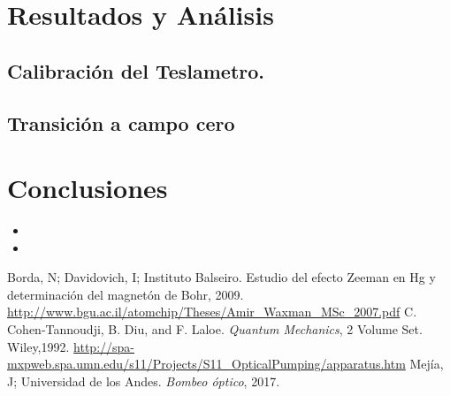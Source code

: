 \documentclass[%
 reprint,
 amsmath,amssymb,
 aps,
]{revtex4-1}
\begin{document}
\section{Resultados y Análisis}
\subsection{Calibración del Teslametro.}
\subsection{Transición a campo cero}


\section{Conclusiones}
\begin{itemize}
    \item 
    \item 
\end{itemize}

\begin{thebibliography}{9}
Borda, N; Davidovich, I; Instituto Balseiro. Estudio del efecto Zeeman en Hg y determinación del magnetón de Bohr, 2009.
\url{http://www.bgu.ac.il/atomchip/Theses/Amir_Waxman_MSc_2007.pdf}
C. Cohen-Tannoudji, B. Diu, and F. Laloe. \textit{Quantum Mechanics}, 2 Volume Set. Wiley,1992.
\url{http://spa-mxpweb.spa.umn.edu/s11/Projects/S11_OpticalPumping/apparatus.htm}
Mejía, J; Universidad de los Andes. \textit{Bombeo óptico}, 2017.

\end{thebibliography}
\end{document}
